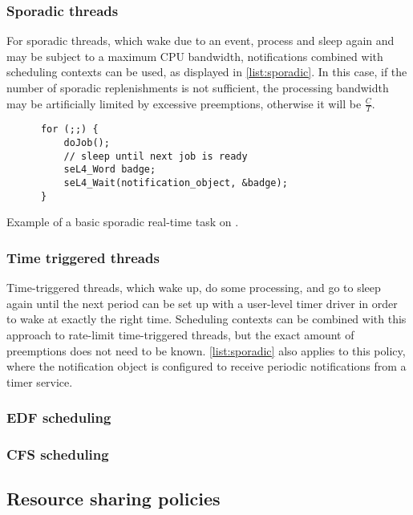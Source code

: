 \subsubsection{Sporadic threads}

For sporadic threads, which wake due to an event, process and sleep again and may be subject to a
maximum CPU bandwidth, notifications combined
with scheduling contexts can be used, as displayed in \cref{list:sporadic}. In this case, if the
number of sporadic replenishments is not sufficient, the processing bandwidth may be artificially
limited by excessive preemptions, otherwise it will be $\frac{C}{T}$. 

\begin{listing}
  \begin{verbatim}
      for (;;) {
          doJob();
          // sleep until next job is ready
          seL4_Word badge;
          seL4_Wait(notification_object, &badge);
      }
  \end{verbatim}
  \caption{Example of a basic sporadic real-time task on \selfour.}
  \label{list:sporadic}
\end{listing}

\subsubsection{Time triggered threads}

Time-triggered threads, which wake up, do some processing, and go to sleep again until the next
period can be set up with a user-level timer driver in order to wake at exactly the right time.
Scheduling contexts can be combined with this approach to rate-limit time-triggered threads, but 
the exact amount of preemptions does not need to be known.
\cref{list:sporadic} also applies to this policy, where the notification object is configured to
receive periodic notifications from a timer service.

\subsubsection{EDF scheduling}


\subsubsection{CFS scheduling}


\subsection{Resource sharing policies}

